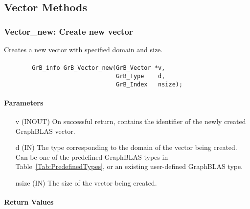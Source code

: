\subsection{Vector Methods}



\subsubsection{{\sf Vector\_new}: Create new vector}

Creates a new vector with specified domain and size.

\paragraph{\syntax}

\begin{verbatim}
        GrB_info GrB_Vector_new(GrB_Vector *v,
                                GrB_Type    d,
                                GrB_Index   nsize);
\end{verbatim}

\paragraph{Parameters}

\begin{itemize}[leftmargin=1.1in]
    \item[{\sf v}] ({\sf INOUT}) On successful return, contains the identifier 
                                 of the newly created GraphBLAS vector.
    \item[{\sf d}] ({\sf IN})    The type corresponding to the domain of the 
                                 vector being created.  Can be one of the 
                                 predefined GraphBLAS types in 
                                 Table~\ref{Tab:PredefinedTypes}, or an existing 
                                 user-defined GraphBLAS type.
    \item[{\sf nsize}] ({\sf IN}) The size of the vector being created.
\end{itemize}

\paragraph{Return Values}

